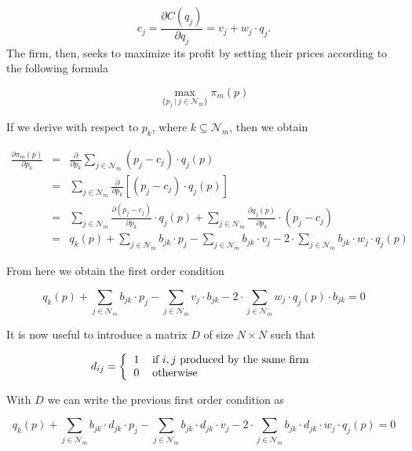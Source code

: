 \documentclass[12pt]{article}
\begin{document}
\begin{equation*}
c_j = \frac{\partial C(q_j)}{\partial q_j}= v_j + w_j \cdot q_j.
\end{equation*}
The firm, then, seeks to maximize its profit by setting their prices according to the following formula

\begin{equation*}
\max_{\{p_j ~ | ~ j \in \mathcal{N}_m\}} \pi_m(p)
\end{equation*}

If we derive with respect to $p_k$, where $k \subseteq \mathcal{N}_m$, then we obtain

\begin{eqnarray*}
\frac{\partial\pi_m(p)}{\partial p_k} &=& \frac{\partial}{\partial p_k} \sum_{j \in \mathcal{N}_m} (p_j - c_j) \cdot q_j(p) \\
&=& \sum_{j \in \mathcal{N}_m} \frac{\partial}{\partial p_k} \left[(p_j - c_j) \cdot q_j(p)\right] \\
&=& \sum_{j \in \mathcal{N}_m} \frac{\partial (p_j - c_j)}{\partial p_k} \cdot q_j(p) + \sum_{j \in \mathcal{N}_m} \frac{\partial q_j(p)}{\partial p_k} \cdot (p_j - c_j)\\
&=& q_k(p) + \sum_{j \in \mathcal{N}_m} b_{jk} \cdot p_j - \sum_{j \in \mathcal{N}_m} b_{jk} \cdot v_j - 2 \cdot \sum_{j \in \mathcal{N}_m} b_{jk} \cdot w_j \cdot q_j (p) 
\end{eqnarray*}

From here we obtain the first order condition

\begin{equation*}
q_k(p) + \sum_{j \in \mathcal{N}_m} b_{jk} \cdot p_j - \sum_{j \in \mathcal{N}_m} v_j \cdot b_{jk} - 2 \cdot \sum_{j \in \mathcal{N}_m} w_j \cdot q_j (p) \cdot b_{jk} = 0
\end{equation*}

It is now useful to introduce a matrix $D$ of size $N \times N$ such that

\begin{equation*}
d_{ij} = \left\{
\begin{tabular}{ll}
1 & if $i,j$ produced by the same firm\\
0 & otherwise
\end{tabular}\right.
\end{equation*}

With $D$ we can write the previous first order condition as

\begin{equation*}
q_k(p) + \sum_{j \in \mathcal{N}_m} b_{jk} \cdot d_{jk} \cdot p_j - \sum_{j \in \mathcal{N}_m} b_{jk} \cdot d_{jk} \cdot v_j - 2 \cdot \sum_{j \in \mathcal{N}_m} b_{jk} \cdot d_{jk} \cdot w_j \cdot q_j (p) = 0
\end{equation*}
\end{document}
